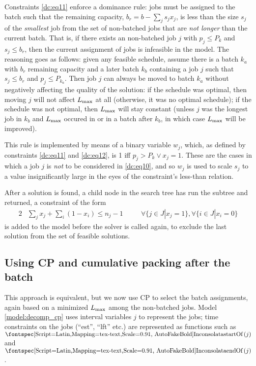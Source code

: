 \documentclass[13pt, letterpaper, oneside]{book}
\begin{document}
Constraints \eqref{dc:eq11} enforce a dominance rule: jobs must be assigned to
the batch such that the remaining capacity, $b_r = b - \sum_j s_j x_j$, is less
than the size $s_j$ of the \textit{smallest} job from the set of non-batched
jobs that are \textit{not longer} than the current batch. That is, if there
exists an non-batched job $j$ with $p_j \leq P_k$ and $s_j \leq b_r$, then the
current assignment of jobs is infeasible in the model. The reasoning goes as
follows: given any feasible schedule, assume there is a batch $k_a$ with $b_r$
remaining capacity and a later batch $k_b$ containing a job $j$ such that $s_j
\leq b_r$ and $p_j \leq P_{k_a}$. Then job $j$ can always be moved to batch
$k_a$ without negatively affecting the quality of the solution: if the schedule
was optimal, then moving $j$ will not affect $L_{\text{max}}$ at all (otherwise, it was
no optimal schedule); if the schedule was not optimal, then $L_{\text{max}}$ will stay
constant (unless $j$ was the longest job in $k_b$ and $L_{\text{max}}$ occured in or in a
batch after $k_b$, in which case $L_{\text{max}}$ will be improved).

This rule is implemented by means of a binary variable $w_j$, which, as defined
by constraints \eqref{dc:eq11} and \eqref{dc:eq12}, is 1 iff $p_j > P_k \lor x_j
= 1$. These are the cases in which a job $j$ is \textit{not} to be considered in
\eqref{dc:eq10}, and so $w_j$ is used to scale $s_j$ to a value insignificantly
large in the eyes of the constraint's less-than relation.

After a solution is found, a child node in the search tree has run the subtree
and returned, a constraint of the form 
\begin{alignat}{2}
& \sum_j x_j + \sum_i (1-x_i) \leq n_j - 1 \quad && \forall \{j \in J | x_j =
1\}, \forall \{i \in J | x_i = 0 \}
\end{alignat}
is added to the model before the solver is called again, to exclude the last
solution from the set of feasible solutions. 

\subsection{Using CP and cumulative packing after the
batch}\label{sec:cpdecomp}
This approach is equivalent, but we now use CP to select the batch assignments,
again based on a minimized $L_{\text{max}}$ among the non-batched jobs. Model
\ref{model:decomp_cp} uses interval variables $j$ to represent the jobs;
time constraints on the jobs (``est'', ``lft'' etc.) are represented as
functions such as $\startOf(j)$ and $\endOf(j)$.
\end{document}
